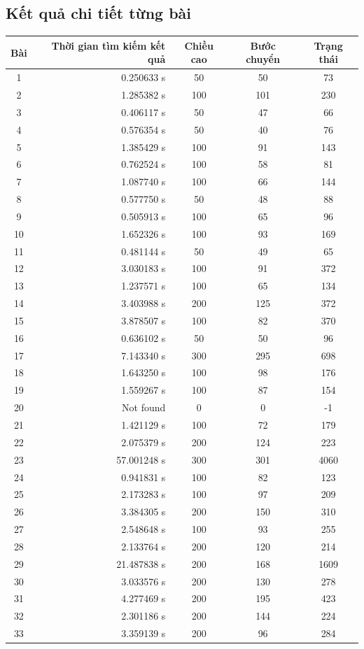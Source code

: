 \documentclass[a4paper]{article}
\begin{document}
\subsection{Kết quả chi tiết từng bài}
\begin{center}
	\begin{tabular}{|c|r|c|c|c|}
		\hline
		Bài & Thời gian tìm kiếm kết quả & Chiều cao & Bước chuyển & Trạng thái \\ \hline
		1   & 0.250633 s	& 50	& 50	& 73 \\ \hline
		2   & 1.285382 s	& 100	& 101	& 230 \\ \hline
		3	& 0.406117 s	& 50 	& 47	& 66 \\ \hline
		4 	& 0.576354 s	& 50	& 40	& 76 \\ \hline
		5	& 1.385429 s	& 100	& 91	& 143\\ \hline
		6	& 0.762524 s	& 100	& 58	& 81 \\ \hline
		7	& 1.087740 s	& 100	& 66	& 144 \\ \hline
		8	& 0.577750 s	& 50	& 48	& 88 \\ \hline
		9	& 0.505913 s	& 100	& 65	& 96 \\ \hline
		10	& 1.652326 s	& 100	& 93	& 169 \\ \hline
		11	& 0.481144 s	& 50	& 49	& 65 \\ \hline
		12	& 3.030183 s	& 100	& 91	& 372 \\ \hline
		13	& 1.237571 s	& 100	& 65	& 134 \\ \hline
		14	& 3.403988 s	& 200	& 125	& 372 \\ \hline
		15	& 3.878507 s	& 100	& 82	& 370 \\ \hline
		16	& 0.636102 s	& 50	& 50	& 96 \\ \hline
		17	& 7.143340 s	& 300	& 295	& 698 \\ \hline
		18	& 1.643250 s	& 100	& 98	& 176 \\ \hline
		19	& 1.559267 s	& 100	& 87	& 154 \\ \hline
		20	& Not found		& 0		& 0		& -1 \\ \hline
		21	& 1.421129 s	& 100	& 72	& 179 \\ \hline
		22	& 2.075379 s	& 200	& 124	& 223 \\ \hline
		23	& 57.001248 s	& 300	& 301	& 4060 \\ \hline
		24	& 0.941831 s	& 100	& 82	& 123 \\ \hline
		25	& 2.173283 s	& 100	& 97	& 209 \\ \hline
		26	& 3.384305 s	& 200	& 150	& 310 \\ \hline
		27	& 2.548648 s	& 100	& 93	& 255 \\ \hline
		28	& 2.133764 s	& 200	& 120	& 214 \\ \hline
		29	& 21.487838 s	& 200	& 168	& 1609 \\ \hline
		30	& 3.033576 s	& 200	& 130	& 278 \\ \hline
		31	& 4.277469 s	& 200	& 195	& 423 \\ \hline
		32	& 2.301186 s	& 200	& 144	& 224 \\ \hline
		33	& 3.359139 s	& 200	& 96	& 284 \\ \hline	
	\end{tabular}	
\end{center}
\newpage
\end{document}
